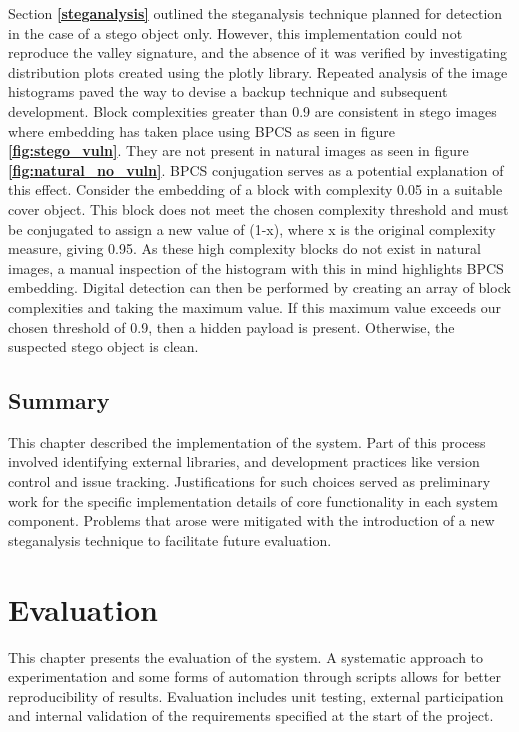 \documentclass{l4proj}
\begin{document}
Section \textbf{\ref{steganalysis}} outlined the steganalysis technique planned for detection in the case of a stego object only. However, this implementation could not reproduce the valley signature, and the absence of it was verified by investigating distribution plots created using the plotly library. Repeated analysis of the image histograms paved the way to devise a backup technique and subsequent development. Block complexities greater than 0.9 are consistent in stego images where embedding has taken place using BPCS as seen in figure \textbf{\ref{fig:stego_vuln}}. They are not present in natural images as seen in figure \textbf{\ref{fig:natural_no_vuln}}. BPCS conjugation serves as a potential explanation of this effect. Consider the embedding of a block with complexity 0.05 in a suitable cover object. This block does not meet the chosen complexity threshold and must be conjugated to assign a new value of (1-x), where x is the original complexity measure, giving 0.95.  As these high complexity blocks do not exist in natural images, a manual inspection of the histogram with this in mind highlights BPCS embedding. Digital detection can then be performed by creating an array of block complexities and taking the maximum value. If this maximum value exceeds our chosen threshold of 0.9, then a hidden payload is present. Otherwise, the suspected stego object is clean.

\section{Summary}

This chapter described the implementation of the system. Part of this process involved identifying external libraries, and development practices like version control and issue tracking. Justifications for such choices served as preliminary work for the specific implementation details of core functionality in each system component. Problems that arose were mitigated with the introduction of a new steganalysis technique to facilitate future evaluation.
 
\chapter{Evaluation} 

This chapter presents the evaluation of the system. A systematic approach to experimentation and some forms of automation through scripts allows for better reproducibility of results. Evaluation includes unit testing, external participation and internal validation of the requirements specified at the start of the project. 
 
\end{document}
